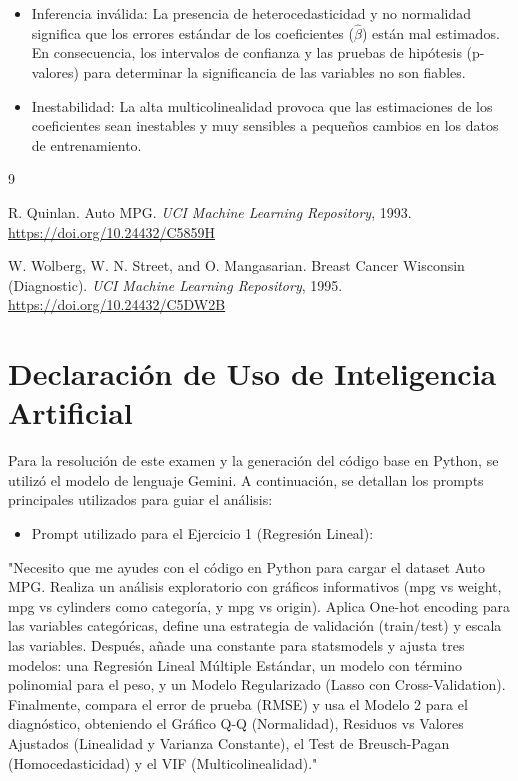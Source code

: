 \documentclass[11pt,spanish]{article}
\begin{document}
\begin{itemize}
    \item Inferencia inválida: La presencia de heterocedasticidad y no normalidad significa que los errores estándar de los coeficientes ($\hat{\beta}$) están mal estimados. En consecuencia, los intervalos de confianza y las pruebas de hipótesis (p-valores) para determinar la significancia de las variables no son fiables.
\end{itemize}

\begin{itemize}
    \item Inestabilidad: La alta multicolinealidad provoca que las estimaciones de los coeficientes sean inestables y muy sensibles a pequeños cambios en los datos de entrenamiento.
\end{itemize}

\begin{thebibliography}{9}

R. Quinlan. Auto MPG. \textit{UCI Machine Learning Repository}, 1993. \url{https://doi.org/10.24432/C5859H}

W. Wolberg, W. N. Street, and O. Mangasarian. Breast Cancer Wisconsin (Diagnostic). \textit{UCI Machine Learning Repository}, 1995. \url{https://doi.org/10.24432/C5DW2B}

\end{thebibliography}

\section{Declaración de Uso de Inteligencia Artificial}

Para la resolución de este examen y la generación del código base en Python, se utilizó el modelo de lenguaje Gemini. A continuación, se detallan los prompts principales utilizados para guiar el análisis:

\begin{itemize}
    \item Prompt utilizado para el Ejercicio 1 (Regresión Lineal):
\end{itemize}

"Necesito que me ayudes con el código en Python para cargar el dataset Auto MPG. Realiza un análisis exploratorio con gráficos informativos (mpg vs weight, mpg vs cylinders como categoría, y mpg vs origin). Aplica One-hot encoding para las variables categóricas, define una estrategia de validación (train/test) y escala las variables. Después, añade una constante para statsmodels y ajusta tres modelos: una Regresión Lineal Múltiple Estándar, un modelo con término polinomial para el peso, y un Modelo Regularizado (Lasso con Cross-Validation). Finalmente, compara el error de prueba (RMSE) y usa el Modelo 2 para el diagnóstico, obteniendo el Gráfico Q-Q (Normalidad), Residuos vs Valores Ajustados (Linealidad y Varianza Constante), el Test de Breusch-Pagan (Homocedasticidad) y el VIF (Multicolinealidad)."
\end{document}
